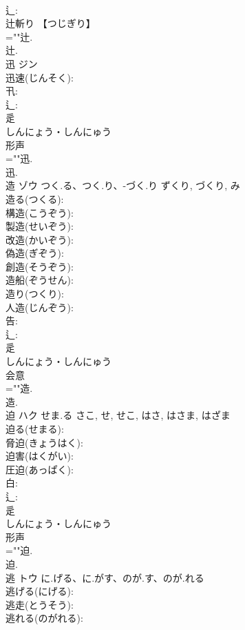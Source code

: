 \documentclass[8pt]{extreport}
\begin{document}
\begin{CJK}{UTF8}{min}
\\	辶: 
\\	辻斬り 【つじぎり】 
\\	=""辻.
\\	辻.
\\	迅	ジン			
\\	迅速(じんそく): 
\\	卂: 
\\	辶: 
\\	辵	
\\	しんにょう・しんにゅう	
\\	形声 
\\	=""迅.
\\	迅.
\\	造	ゾウ	つく.る、つく.り、-づく.り	ずくり, づくり, み	
\\	造る(つくる): 
\\	構造(こうぞう): 
\\	製造(せいぞう): 
\\	改造(かいぞう): 
\\	偽造(ぎぞう): 
\\	創造(そうぞう): 
\\	造船(ぞうせん): 
\\	造り(つくり): 
\\	人造(じんぞう): 
\\	告: 
\\	辶: 
\\	辵	
\\	しんにょう・しんにゅう	
\\	会意 
\\	=""造.
\\	造.
\\	迫	ハク	せま.る	さこ, せ, せこ, はさ, はさま, はざま	
\\	迫る(せまる): 
\\	脅迫(きょうはく): 
\\	迫害(はくがい): 
\\	圧迫(あっぱく): 
\\	白: 
\\	辶: 
\\	辵	
\\	しんにょう・しんにゅう	
\\	形声 
\\	=""迫.
\\	迫.
\\	逃	トウ	に.げる、に.がす、のが.す、のが.れる		
\\	逃げる(にげる): 
\\	逃走(とうそう): 
\\	逃れる(のがれる): 

\end{CJK}
\end{document}
